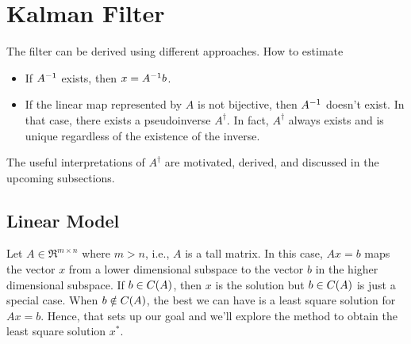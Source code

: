 \section{Kalman Filter}
\hspace{\parindent}The filter can be derived using different approaches. How to estimate

\begin{itemize}
    \item If ${A}^{-1}$ exists, then $x = {A}^{-1} b$.
    \item If the linear map represented by $A$ is not bijective, then ${A}^{-1}$ doesn't exist. In that case, there exists a pseudoinverse $A^{\dag}$. In fact, $A^{\dag}$ always exists and is unique regardless of the existence of the inverse.
\end{itemize}

The useful interpretations of $A^\dag$ are motivated, derived, and discussed in the upcoming subsections.

\subsection{Linear Model}
\hspace{\parindent}Let $A \in \Re^{m \times n}$ where $m > n$, i.e., $A$ is a tall matrix. In this case, $A x = b$ maps the vector $x$ from a lower dimensional subspace to the vector $b$ in the higher dimensional subspace. If $b \in C({A})$, then $x$ is the solution but $b \in C({A})$ is just a special case. When $b \notin C({A})$, the best we can have is a least square solution for $A x = b$. Hence, that sets up our goal and we'll explore the method to obtain the least square solution $x^*$.